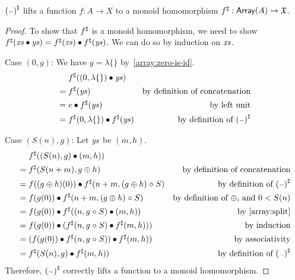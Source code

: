 %
\begin{toappendix}
    \begin{proposition}
        $\ext{(\blank)}$ lifts a function $f : A \to X$ to a monoid homomorphism ${f}^{\sharp} : \operatorname{\mathsf{Array}}(A) \to \mathfrak{X}$.
    \end{proposition}

    \begin{proof}
        To show that ${f}^{\sharp}$ is a monoid homomorphism,
        we need to show ${f}^{\sharp}(\mathit{xs} \mathbin{\bullet} \mathit{ys}) = {f}^{\sharp}(\mathit{xs}) \mathbin{\bullet} {f}^{\sharp}(\mathit{ys})$.
        We can do so by induction on $\mathit{xs}$.

        Case $(0, g)$:
        We have $g = \lambda\{\}$ by~\cref{array:zero-is-id}.
        \begin{align*}
             & \mathrel{\phantom{=}} \ext{f}((0, \lambda\{\}) \mult \ys)                                            \\
             & = \ext{f}(\ys)                                            & \text{by definition of concatenation}    \\
             & = e \mult \ext{f}(\ys)                                    & \text{by left unit}                      \\
             & = \ext{f}(0, \lambda\{\}) \mult \ext{f}(\ys)              & \text{by definition of $\ext{(\blank)}$} \\
        \end{align*}

        Case $(S(n), g)$: Let $\mathit{ys}$ be $(m, h)$.
        \begin{align*}
             & \mathrel{\phantom{=}} \ext{f}((S(n), g) \mult (m, h))                                                              \\
             & = \ext{f}(S(n + m), g \oplus h)                                 & \text{by definition of concatenation}            \\
             & = f((g \oplus h)(0)) \mult \ext{f}(n + m, (g \oplus h) \comp S) & \text{by definition of $\ext{(\blank)}$}         \\
             & = f(g(0)) \mult \ext{f}(n + m, (g \oplus h) \comp S)            & \text{by definition of $\oplus$, and $0 < S(n)$} \\
             & = f(g(0)) \mult \ext{f}((n, g \comp S) \mult (m, h))            & \text{by~\cref{array:split}}                     \\
             & = f(g(0)) \mult (\ext{f}(n, g \comp S) \mult \ext{f}(m, h)))    & \text{by induction}                              \\
             & = (f(g(0)) \mult \ext{f}(n, g \comp S)) \mult \ext{f}(m, h))    & \text{by associativity}                          \\
             & = \ext{f}(S(n), g) \mult \ext{f}(m, h))                         & \text{by definition of $\ext{(\blank)}$}         \\
        \end{align*}
        Therefore, $\ext{(\blank)}$ correctly lifts a function to a monoid homomorphism.
    \end{proof}
\end{toappendix}
